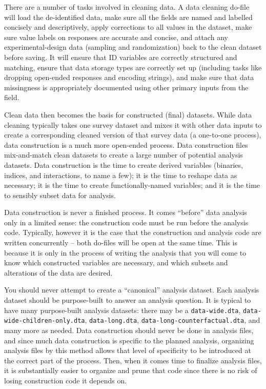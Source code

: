 There are a number of tasks involved in cleaning data.
A data cleaning do-file will load the de-identified data,
make sure all the fields are named and labelled concisely and descriptively,
apply corrections to all values in the dataset,
make sure value labels on responses are accurate and concise,
and attach any experimental-design data (sampling and randomization)
back to the clean dataset before saving.
It will ensure that ID variables are correctly structured and matching,
ensure that data storage types are correctly set up
(including tasks like dropping open-ended responses and encoding strings),
and make sure that data missingness is appropriately documented
using other primary inputs from the field.

Clean data then becomes the basis for constructed (final) datasets.
While data cleaning typically takes one survey dataset
and mixes it with other data inputs to create a corresponding
cleaned version of that survey data (a one-to-one process),
data construction is a much more open-ended process.
Data construction files mix-and-match clean datasets
to create a large number of potential analysis datasets.
Data construction is the time to create derived variables
(binaries, indices, and interactions, to name a few);
it is the time to reshape data as necessary;
it is the time to create functionally-named variables;
and it is the time to sensibly subset data for analysis.

Data construction is never a finished process.
It comes ``before'' data analysis only in a limited sense:
the construction code must be run before the analysis code.
Typically, however it is the case that the construction and analysis code
are written concurrently -- both do-files will be open at the same time.
This is because it is only in the process of writing the analysis
that you will come to know which constructed variables are necessary,
and which subsets and alterations of the data are desired.

You should never attempt to create a ``canonical'' analysis dataset.
Each analysis dataset should be purpose-built to answer an analysis question.
It is typical to have many purpose-built analysis datasets:
there may be a \texttt{data-wide.dta},
\texttt{data-wide-children-only.dta}, \texttt{data-long.dta},
\texttt{data-long-counterfactual.dta}, and many more as needed.
Data construction should never be done in analysis files,
and since much data construction is specific to the planned analysis,
organizing analysis files by this method allows that level of specificity
to be introduced at the correct part of the process.
Then, when it comes time to finalize analysis files,
it is substantially easier to organize and prune that code
since there is no risk of losing construction code it depends on.


